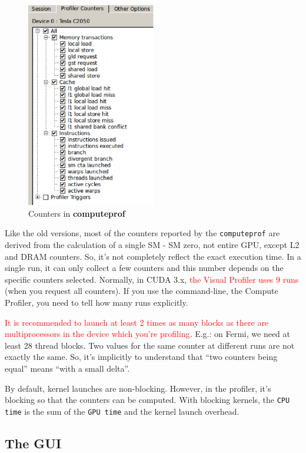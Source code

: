 \begin{figure}[hbt]
  \centerline{\includegraphics[height=9cm,
    angle=0]{./images/counter_profiler.eps}}
\caption{Counters in {\bf computeprof}}
\label{fig:counter_profiler}
\end{figure}

Like the old versions, most of the counters reported by the
\verb!computeprof!  are derived from the calculation of a single SM -
SM zero, not entire GPU, except L2 and DRAM counters. So, it's not
completely reflect the exact execution time. In a single run, it can
only collect a few counters and this number depends on the specific
counters selected. Normally, in CUDA 3.x,
\textcolor{red}{the Visual Profiler uses 9 runs} (when you request all
counters). If you use the command-line, the Compute Profiler, you need
to tell how many runs explicitly.

\begin{framed}
  \textcolor{red}{It is recommended to launch at least 2 times as many
    blocks as there are multiprocessors in the device which you're
    profiling}. E.g.: on Fermi, we need at least 28 thread blocks. 
  Two values for the same counter at different runs are not exactly
  the same. So, it's implicitly to understand that ``two counters
  being equal'' means ``with a small delta''. 

  By default, kernel launches are non-blocking. However, in the
  profiler, it's blocking so that the counters can be computed. With
  blocking kernels, the \verb!CPU time! is the sum of the
  \verb!GPU time! and the kernel launch overhead.
\end{framed}

\subsection{The GUI}
\label{sec:gui}

